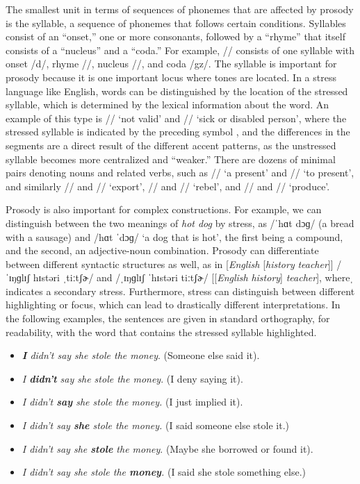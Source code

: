 The smallest unit in terms of sequences of phonemes that are affected by prosody is the syllable, a sequence of phonemes that follows certain conditions. Syllables consist of an ``onset,'' one or more consonants, followed by a ``rhyme'' that itself consists of a ``nucleus'' and a ``coda.'' For example, // consists of one syllable with onset /d/, rhyme //, nucleus //, and coda /gz/. The syllable is important for prosody because it is one important locus where tones are located. In a stress language like English, words can be distinguished by the location of the stressed syllable, which is determined by the lexical information about the word. An example of this type is // `not valid' and // `sick or disabled person', where the stressed syllable is indicated by the preceding symbol , and the differences in the segments are a direct result of the different accent patterns, as the unstressed syllable becomes more centralized and ``weaker.'' There are dozens of minimal pairs denoting nouns and related verbs, such as // `a present' and // `to present', and similarly // and // `export', // and // `rebel', and // and // `produce'. 

Prosody is also important for complex constructions. For example, we can distinguish between the two meanings of \textit{hot dog} by stress, as /ˈhɑt dɔɡ/ (a bread with a sausage) and /hɑt ˈdɔɡ/ ‘a dog that is hot’, the first being a compound, and the second, an adjective-noun combination. Prosody can differentiate between different syntactic structures as well, as in [\textit{English} [\textit{history} \textit{teacher}]] /ˈɪŋɡlɪʃ hɪstəri ˌtiːtʃɚ/ and /ˌɪŋɡlɪʃ ˈhɪstəri tiːtʃɚ/ [[\textit{English} \textit{history}] \textit{teacher}], whereˌ indicates a secondary stress. Furthermore, stress can distinguish between different highlighting or focus, which can lead to drastically different interpretations. In the following examples, the sentences are given in standard orthography, for readability, with the word that contains the stressed syllable highlighted.

\begin{itemize}
    \item \textit{\textbf{I} didn’t say she stole the money}. (Someone else said it).
    \item \textit{I \textbf{didn’t }say she stole the money}. (I deny saying it).
    \item \textit{I didn’t \textbf{say} she stole the money.}	(I just implied it).
    \item \textit{I didn’t say \textbf{she} stole the money.} (I said someone else stole it.)
    \item \textit{I didn’t say she \textbf{stole} the money}. (Maybe she borrowed or found it).
    \item \textit{I didn’t say she stole the \textbf{money}.} (I said she stole something else.)
\end{itemize}

